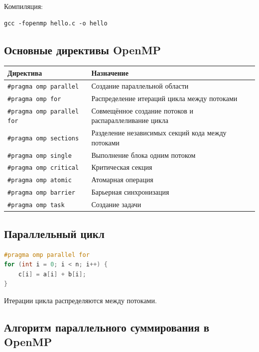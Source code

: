 \documentclass[12pt,a4paper]{article}
\begin{document}
Компиляция:

\begin{lstlisting}
gcc -fopenmp hello.c -o hello
\end{lstlisting}

\subsection{Основные директивы OpenMP}

\begin{center}
\begin{tabular}{|p{5cm}|p{9cm}|}
\hline
\textbf{Директива} & \textbf{Назначение} \\
\hline
\texttt{\#pragma omp parallel} & Создание параллельной области \\
\hline
\texttt{\#pragma omp for} & Распределение итераций цикла между потоками \\
\hline
\texttt{\#pragma omp parallel for} & Совмещённое создание потоков и распараллеливание цикла \\
\hline
\texttt{\#pragma omp sections} & Разделение независимых секций кода между потоками \\
\hline
\texttt{\#pragma omp single} & Выполнение блока одним потоком \\
\hline
\texttt{\#pragma omp critical} & Критическая секция \\
\hline
\texttt{\#pragma omp atomic} & Атомарная операция \\
\hline
\texttt{\#pragma omp barrier} & Барьерная синхронизация \\
\hline
\texttt{\#pragma omp task} & Создание задачи \\
\hline
\end{tabular}
\end{center}

\subsection{Параллельный цикл}

\begin{lstlisting}[language=C]
#pragma omp parallel for
for (int i = 0; i < n; i++) {
    c[i] = a[i] + b[i];
}
\end{lstlisting}

Итерации цикла распределяются между потоками.

\subsection{Алгоритм параллельного суммирования в OpenMP}
\end{document}
